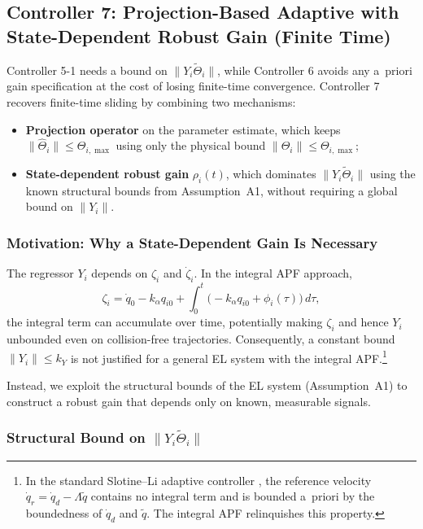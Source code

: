 \subsection{Controller 7: Projection-Based Adaptive with State-Dependent Robust Gain (Finite Time)}
\label{sec: controller7}

Controller 5-1 needs a bound on $\|Y_i\tilde{\Theta}_i\|$, while Controller 6 avoids any
a~priori gain specification at the cost of losing finite-time convergence. Controller 7
recovers finite-time sliding by combining two mechanisms:
\begin{itemize}
	\item \textbf{Projection operator} on the parameter estimate, which keeps
		$\|\hat{\Theta}_i\| \le \Theta_{i,\max}$ using only the physical bound
		$\|\Theta_i\| \le \Theta_{i,\max}$;
	\item \textbf{State-dependent robust gain} $\rho_i(t)$, which dominates
		$\|Y_i\tilde{\Theta}_i\|$ using the known structural bounds from Assumption~A1,
		without requiring a global bound on $\|Y_i\|$.
\end{itemize}

\subsubsection{Motivation: Why a State-Dependent Gain Is Necessary}

The regressor $Y_i$ depends on $\zeta_i$ and $\dot{\zeta}_i$.  In the integral APF approach,
\begin{equation*}
	\zeta_i = \dot{q}_0 - k_\alpha q_{i0} + \int_0^t \bigl(-k_\alpha q_{i0} + \phi_i(\tau)\bigr)\,d\tau,
\end{equation*}
the integral term can accumulate over time, potentially making $\zeta_i$ and hence $Y_i$
unbounded even on collision-free trajectories.  Consequently, a constant bound
$\|Y_i\| \le k_Y$ is not justified for a general EL system with the integral APF.\footnote{In
the standard Slotine--Li adaptive controller \cite{slotineAdaptiveControlRobot1987}, the
reference velocity $\dot{q}_r = \dot{q}_d - \Lambda\tilde{q}$ contains no integral term and
is bounded a~priori by the boundedness of $\dot{q}_d$ and $\tilde{q}$.  The integral APF
relinquishes this property.}

Instead, we exploit the structural bounds of the EL system (Assumption~A1) to construct a
robust gain that depends only on known, measurable signals.

\subsubsection{Structural Bound on $\|Y_i\tilde{\Theta}_i\|$}

